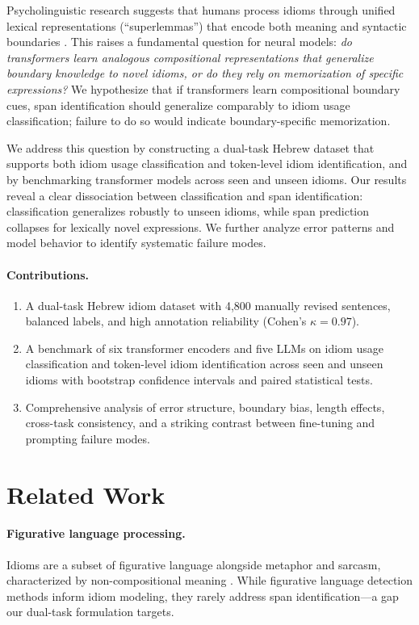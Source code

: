 \documentclass[11pt]{article}
\begin{document}
Psycholinguistic research suggests that humans process idioms through unified lexical representations (``superlemmas'') that encode both meaning and syntactic boundaries \citep{sprenger2006lexical}. This raises a fundamental question for neural models: \textit{do transformers learn analogous compositional representations that generalize boundary knowledge to novel idioms, or do they rely on memorization of specific expressions?} We hypothesize that if transformers learn compositional boundary cues, span identification should generalize comparably to idiom usage classification; failure to do so would indicate boundary-specific memorization.

We address this question by constructing a dual-task Hebrew dataset that supports both idiom usage classification and token-level idiom identification, and by benchmarking transformer models across seen and unseen idioms. Our results reveal a clear dissociation between classification and span identification: classification generalizes robustly to unseen idioms, while span prediction collapses for lexically novel expressions. We further analyze error patterns and model behavior to identify systematic failure modes.

\paragraph{Contributions.}
\begin{enumerate}
    \item A dual-task Hebrew idiom dataset with 4,800 manually revised sentences, balanced labels, and high annotation reliability (Cohen's $\kappa = 0.97$).
    \item A benchmark of six transformer encoders and five LLMs on idiom usage classification and token-level idiom identification across seen and unseen idioms with bootstrap confidence intervals and paired statistical tests.
    \item Comprehensive analysis of error structure, boundary bias, length effects, cross-task consistency, and a striking contrast between fine-tuning and prompting failure modes.
\end{enumerate}

\section{Related Work}

\paragraph{Figurative language processing.}
Idioms are a subset of figurative language alongside metaphor and sarcasm, characterized by non-compositional meaning \citep{shutova2015design}. While figurative language detection methods inform idiom modeling, they rarely address span identification---a gap our dual-task formulation targets.
\end{document}
